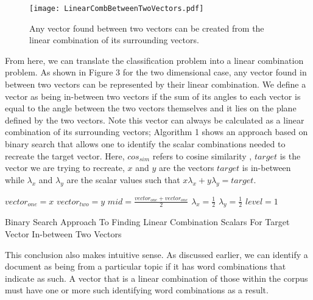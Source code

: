 \documentclass[11pt]{article}
\begin{document}
\begin{figure}[h]
\centerline{\texttt{[image: LinearCombBetweenTwoVectors.pdf]}}
\caption{Any vector found between two vectors can be created from the linear combination of its surrounding vectors.}
\label{fig}
\end{figure}

From here, we can translate the classification problem into a linear combination problem. As shown in Figure 3 for the two dimensional case, any vector found in between two vectors can be represented by their linear combination. We define a vector as being in-between two vectors if the sum of its angles to each vector is equal to the angle between the two vectors themselves and it lies on the plane defined by the two vectors. Note this vector can always be calculated as a linear combination of its surrounding vectors; Algorithm 1 shows an approach based on binary search that allows one to identify the scalar combinations needed to recreate the target vector. Here, $cos_{sim}$ refers to cosine similarity \cite{sitikhu2019comparison}, $target$ is the vector we are trying to recreate, $x$ and $y$ are the vectors $target$ is in-between while $\lambda_x$ and $\lambda_y$ are the scalar values such that $x\lambda_x + y\lambda_y = target$.

\begin{algorithm}[htbp]
\SetAlgoLined
{}
 $vector_{one} = x$\;
 $vector_{two} = y$\;
 $mid = \frac{vector_{one} + vector_{one}}{2}$\;
 $\lambda_x = \frac{1}{2}$\;
 $\lambda_y = \frac{1}{2}$\;
 $level = 1$\;
 \caption{Binary Search Approach To Finding Linear Combination Scalars For Target Vector In-between Two Vectors}
\end{algorithm}

This conclusion also makes intuitive sense. As discussed earlier, we can identify a document as being from a particular topic if it has word combinations that indicate as such. A vector that is a linear combination of those within the corpus must have one or more such identifying word combinations as a result.
\end{document}
